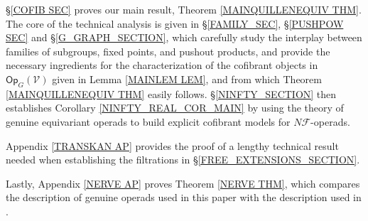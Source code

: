 \documentclass[a4paper,10pt
,draft
]{article}%
\numberwithin{equation}{section}
\numberwithin{figure}{section}
\theoremstyle{definition} %
\newcommand{\1}{\ensuremath{\mathbbm 1}}%
\begin{document}
\S \ref{COFIB SEC} proves our main result,
Theorem \ref{MAINQUILLENEQUIV THM}.
The core of the technical analysis 
is given in 
\S \ref{FAMILY_SEC},
\S \ref{PUSHPOW SEC}
and \S \ref{G_GRAPH_SECTION}, 
which carefully study the interplay between families of subgroups, fixed points, and pushout products,
and provide the necessary ingredients for
the characterization of the cofibrant objects
in $\mathsf{Op}_G (\mathcal{V})$
given in Lemma \ref{MAINLEM LEM},
and from which 
Theorem \ref{MAINQUILLENEQUIV THM}
easily follows.
\S \ref{NINFTY_SECTION}
then establishes Corollary 
\ref{NINFTY_REAL_COR_MAIN}
by using the theory of genuine equivariant operads
to build explicit cofibrant models for 
$N \mathcal{F}$-operads.

Appendix \ref{TRANSKAN AP}
provides the proof of a lengthy technical result needed when establishing the filtrations in \S \ref{FREE_EXTENSIONS_SECTION}.

Lastly, Appendix \ref{NERVE AP} proves Theorem \ref{NERVE THM},
which compares the description of genuine operads used in this paper 
with the description used in \cite{BP_edss}.


\end{document}
